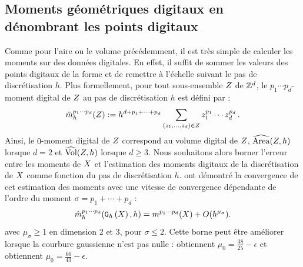 \subsection{Moments géométriques digitaux en dénombrant les points digitaux}
\label{sec:MomentsByCounting}
%
Comme pour l'aire ou le volume précédemment, il est très simple de calculer les
moments sur des données digitales. En effet, il suffit de sommer les valeurs des
points digitaux de la forme et de remettre à l'échelle suivant le pas de
discrétisation $h$. Plus formellement, pour tout sous-ensemble $Z$ de
$\mathbb{Z}^d$, le $p_1 \cdots p_d$-moment digital de $Z$ au pas de
discrétisation $h$ est défini par :
%
\begin{equation} \label{eq:MomentsByCounting-def}
%
  \DMom{p_1 \cdots p_d}{h}(\DigShape) \EqDef h^{d + p_1 + \cdots + p_d} \sum_{(z_1,\ldots,z_d) \in \DigShape} z_1^{p_1} \cdots z_d^{p_d} \,.
%
\end{equation}
%
Ainsi, le $0$-moment digital de $Z$ correspond au volume digital de
$Z$, \cad $\widehat{\mathrm{Area}}(Z,h)$ lorsque $d = 2$ et $\widehat{\mathrm{Vol}}(Z,h)$
lorsque $d \geq 3$.
%
Nous souhaitons alors borner l'erreur entre les moments de $X$ et
l'estimation des moments digitaux de la discrétisation de $X$ comme
fonction du pas de discrétisation $h$.  ont
démontré la convergence de cet estimation des moments avec une vitesse de
convergence dépendante de l'ordre du moment $\sigma = p_1 + \cdots + p_d$ :
%
\begin{equation} \label{eq:MomentsByCounting-conv}
%
  \DMom{p_1 \cdots p_d}{h}(\DigF{\Shape}{h},h) = \Mom{p_1 \cdots p_d}(\Shape) + O(h^{\mu_{\sigma}}).
%
\end{equation}
%
avec $\mu_{\sigma} \ge 1$ en dimension 2 et 3, pour $\sigma \le 2$.
Cette borne peut être améliorer lorsque la courbure gaussienne n'est pas nulle :
 obtiennent $\mu_0=\frac{38}{25}-\epsilon$ et
 obtiennent $\mu_0 = \frac{66}{43}-\epsilon$.
%
